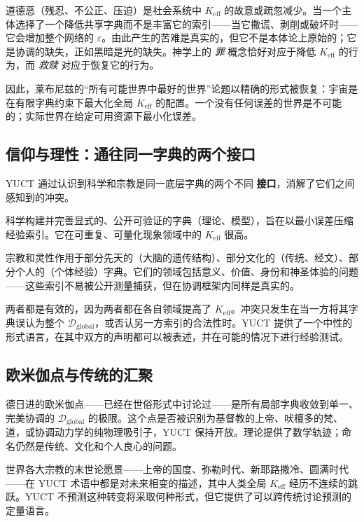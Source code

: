 \documentclass[12pt,a4paper]{article}
\begin{document}
	道德恶（残忍、不公正、压迫）是社会系统中 \(K_{\mathrm{eff}}\) 的故意或疏忽减少。当一个主体选择了一个降低共享字典而不是丰富它的索引——当它撒谎、剥削或破坏时——它会增加整个网络的 \(\varepsilon\)。由此产生的苦难是真实的，但它不是本体论上原始的；它是协调的缺失，正如黑暗是光的缺失。神学上的 \emph{罪} 概念恰好对应于降低 \(K_{\mathrm{eff}}\) 的行为，而 \emph{救赎} 对应于恢复它的行为。
	
	因此，莱布尼兹的“所有可能世界中最好的世界”论题以精确的形式被恢复：宇宙是在有限字典约束下最大化全局 \(K_{\mathrm{eff}}\) 的配置。一个没有任何误差的世界是不可能的；实际世界在给定可用资源下最小化误差。
	
	\subsection{信仰与理性：通往同一字典的两个接口}
	
	YUCT 通过认识到科学和宗教是同一底层字典的两个不同 \textbf{接口}，消解了它们之间感知到的冲突。
	
	科学构建并完善显式的、公开可验证的字典（理论、模型），旨在以最小误差压缩经验索引。它在可重复、可量化现象领域中的 \(K_{\mathrm{eff}}\) 很高。
	
	宗教和灵性作用于部分先天的（大脑的遗传结构）、部分文化的（传统、经文）、部分个人的（个体经验）字典。它们的领域包括意义、价值、身份和神圣体验的问题——这些索引不易被公开测量捕获，但在协调框架内同样是真实的。
	
	两者都是有效的，因为两者都在各自领域提高了 \(K_{\mathrm{eff}}\)。冲突只发生在当一方将其字典误认为整个 \(\mathcal{D}_{\text{global}}\)，或否认另一方索引的合法性时。YUCT 提供了一个中性的形式语言，在其中双方的声明都可以被表述，并在可能的情况下进行经验测试。
	
	\subsection{欧米伽点与传统的汇聚}
	
	德日进的欧米伽点——已经在世俗形式中讨论过——是所有局部字典收敛到单一、完美协调的 \(\mathcal{D}_{\text{global}}\) 的极限。这个点是否被识别为基督教的上帝、吠檀多的梵、道，或协调动力学的纯物理吸引子，YUCT 保持开放。理论提供了数学轨迹；命名仍然是传统、文化和个人良心的问题。
	
	世界各大宗教的末世论愿景——上帝的国度、弥勒时代、新耶路撒冷、圆满时代——在 YUCT 术语中都是对未来相变的描述，其中人类全局 \(K_{\mathrm{eff}}\) 经历不连续的跳跃。YUCT 不预测这种转变将采取何种形式，但它提供了可以跨传统讨论预测的定量语言。
	
\end{document}
